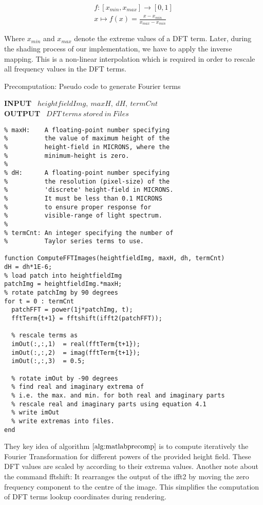 \begin{align}
  f:\left[x_{min},x_{max}\right]\to \left[0,1\right] \nonumber\\
  x \mapsto f(x) = \frac{x-x_{min}}{x_{max}-x_{min}}
\label{eq:dfttermnormalization}
\end{align}

Where $x_{min}$ and $x_{max}$ denote the extreme values of a DFT term. Later, during the shading process of our implementation, we have to apply the inverse mapping. This is a non-linear interpolation which is required in order to rescale all frequency values in the DFT terms. 

\begin{algorithm}[H]
\caption{Precomputation: Pseudo code to generate Fourier terms}
\textbf{INPUT} \ $heightfieldImg, \ maxH, \ dH, \ termCnt$ \\
\textbf{OUTPUT} \ $DFT \ terms \ stored \ in \ Files$
\begin{lstlisting}
% maxH:    A floating-point number specifying 
%          the value of maximum height of the 
%          height-field in MICRONS, where the 
%          minimum-height is zero. 
%         
% dH:      A floating-point number specifying 
%          the resolution (pixel-size) of the 
%          'discrete' height-field in MICRONS. 
%          It must be less than 0.1 MICRONS 
%          to ensure proper response for 
%          visible-range of light spectrum.
%
% termCnt: An integer specifying the number of 
%          Taylor series terms to use.

function ComputeFFTImages(heightfieldImg, maxH, dh, termCnt)
dH = dh*1E-6;
% load patch into heightfieldImg
patchImg = heightfieldImg.*maxH;
% rotate patchImg by 90 degrees
for t = 0 : termCnt
  patchFFT = power(1j*patchImg, t);
  fftTerm{t+1} = fftshift(ifft2(patchFFT));
  
  % rescale terms as
  imOut(:,:,1)  = real(fftTerm{t+1});
  imOut(:,:,2)  = imag(fftTerm{t+1});
  imOut(:,:,3)  = 0.5;
  
  % rotate imOut by -90 degrees
  % find real and imaginary extrema of 
  % i.e. the max. and min. for both real and imaginary parts
  % rescale real and imaginary parts using equation 4.1
  % write imOut 
  % write extremas into files.
end
\end{lstlisting}
\label{alg:matlabprecomp}
\end{algorithm}

They key idea of algorithm $\ref{alg:matlabprecomp}$ is to compute iteratively the Fourier Transformation for different powers of the provided height field. These DFT values are scaled by according to their extrema values. Another note about the command fftshift: It rearranges the output of the ifft2 by moving the zero frequency component to the centre of the image. This simplifies the computation of DFT terms lookup coordinates during rendering.



